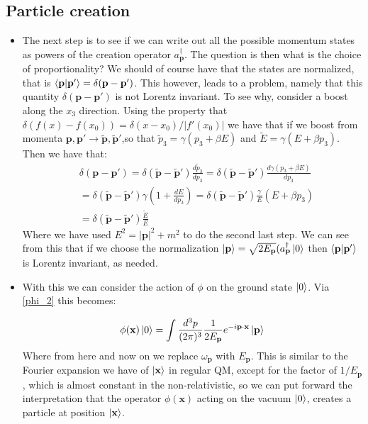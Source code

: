 \documentclass[11pt]{article}
\numberwithin{equation}{section}
\begin{document}
\subsection{Particle creation}
\begin{itemize}
\item The next step is to see if we can write out all the possible momentum states as powers of the creation operator $a^{\dagger}_{\textbf{p}}$. The question is then what is the choice of proportionality? We should of course have that the states are normalized, that is $\braket{\textbf{p}|\textbf{p}'} = \delta(\textbf{p}-\textbf{p}')$. This however, leads to a problem, namely that this quantity $\delta(\textbf{p}-\textbf{p}')$ is not Lorentz invariant. To see why, consider a boost along the $x_3$ direction. Using the property that $\delta(f(x)-f(x_0)) = \delta(x-x_0)/|f'(x_0)|$ we have that if we boost from momenta $\textbf{p},\textbf{p}' \rightarrow \tilde{\textbf{p}},\tilde{\textbf{p}}'$,so that $\tilde{p}_3 = \gamma(p_3+\beta E)$ and $\tilde{E} = \gamma(E + \beta p_3)$. Then we have that: 
\begin{equation*}
  \begin{split}
   &  \delta(\textbf{p}-\textbf{p}') = \delta(\tilde{\textbf{p}}-\tilde{\textbf{p}}') \frac{d \tilde{p}_3}{d p_3}  = \delta(\tilde{\textbf{p}}-\tilde{\textbf{p}}') \frac{d \gamma(p_3+\beta E)}{dp_3} \\
    &  =   \delta(\tilde{\textbf{p}}-\tilde{\textbf{p}}')\gamma \left(1 + \frac{d E}{dp_3}\right)  =  \delta(\tilde{\textbf{p}}-\tilde{\textbf{p}}')\frac{\gamma}{E} \left(E + \beta p_3\right) \\
    & =  \delta(\tilde{\textbf{p}}-\tilde{\textbf{p}}')\frac{\tilde{E}}{E} 
  \end{split}
\end{equation*}
Where we have used $E^2 = |\textbf{p}|^2+m^2$ to do the second last step. We can see from this that if we choose the normalization $\ket{\textbf{p}} = \sqrt{2E_{\textbf{p}}}(a^{\dagger}_{\textbf{p}}\ket{0}$ then $\braket{\textbf{p}|\textbf{p}'}$ is Lorentz invariant, as needed. 

\item With this we can consider the action of $\phi$ on the ground state $\ket{0}$. Via \ref{phi_2} this becomes: 

\[
  \phi(\textbf{x})\ket{0} = \int \frac{d^3p}{(2\pi)^3}\frac{1}{2E_{\textbf{p}}}e^{-i\textbf{p}\cdot \textbf{x}}\ket{\textbf{p}} 
\]
Where from here and now on we replace $\omega_{\textbf{p}}$ with $E_{\textbf{p}}$. This is similar to the Fourier expansion we have of $\ket{\textbf{x}}$ in regular QM, except for the factor of $1/E_{\textbf{p}}$, which is almost constant in the non-relativistic, so we can put forward the interpretation that the operator $\phi(\textbf{x})$ acting on the vacuum $\ket{0}$, creates a particle at position $\ket{\textbf{x}}$. 
\end{itemize}
\end{document}
